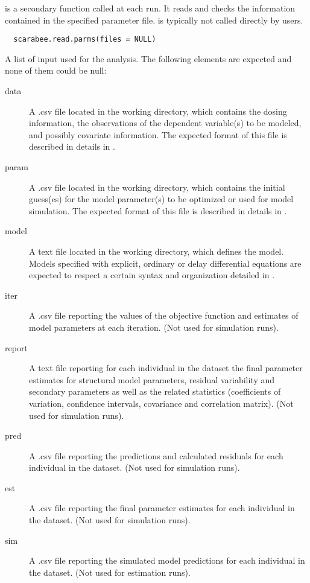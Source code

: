 %
\begin{Description}\relax
{} is a secondary function called at each 
 run. It reads and checks the information contained in the 
specified parameter file. is typically not called
directly by users.
\end{Description}
%
\begin{Usage}
\begin{verbatim}
  scarabee.read.parms(files = NULL)
\end{verbatim}
\end{Usage}
%
\begin{Arguments}
\begin{ldescription}
\item[\code{files}] A list of input used for the analysis. The following elements are
expected and none of them could be null: \begin{description}

\item[data] A .csv file located in the working directory, which contains
the dosing information, the observations of the dependent variable(s)
to be modeled, and possibly covariate information. The expected format 
of this file is described in details in .
\item[param] A .csv file located in the working directory, which contains
the initial guess(es) for the model parameter(s) to be optimized or used
for model simulation. The expected format of this file is described in
details in .
\item[model] A text file located in the working directory, which defines 
the model. Models specified with explicit, ordinary or delay 
differential equations are expected to respect a certain syntax and 
organization detailed in .
\item[iter] A .csv file reporting the values of the objective function
and estimates of model parameters at each iteration.  (Not used for 
simulation runs).
\item[report] A text file reporting for each individual in the dataset the
final parameter estimates for structural model parameters, residual 
variability and secondary parameters as well as the related statistics 
(coefficients of variation, confidence intervals, covariance and 
correlation matrix). (Not used for simulation runs).
\item[pred] A .csv file reporting the predictions and calculated residuals
for each individual in the dataset. (Not used for simulation runs).
\item[est] A .csv file reporting the final parameter estimates for each
individual in the dataset. (Not used for simulation runs).
\item[sim] A .csv file reporting the simulated model predictions for each 
individual in the dataset. (Not used for estimation runs).


\end{description}
\end{ldescription}
\end{Arguments}
